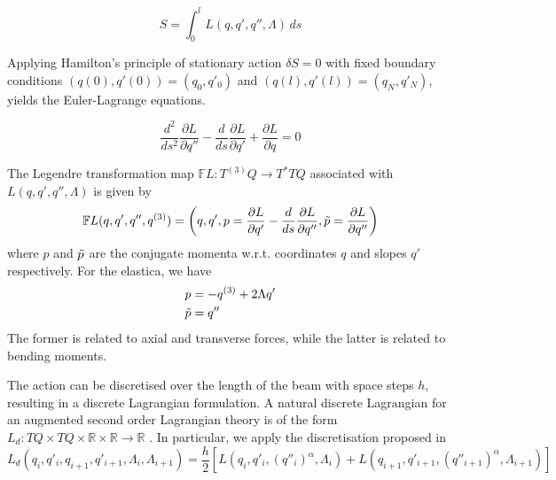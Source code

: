 \begin{equation}
    S = \int_{0}^{l} L \left(q,q',q'',\Lambda \right) \,ds 
\end{equation}

Applying Hamilton’s principle of stationary action $\delta S =0$ with fixed boundary conditions $(q(0),q'(0)) = (q_0,q'_0)$ and $(q(l),q'(l)) = (q_N, q'_N)$, yields the Euler-Lagrange equations.

\begin{equation}\label{eq:second_order_ELeq}
    \frac{d^2}{d s^2}  \frac{\partial L}{\partial q''} - \frac{d}{d s}  \frac{\partial L}{\partial q'} + \frac{\partial L}{\partial q} = 0
\end{equation}

The Legendre transformation map $\mathbb{F} L: T^{(3)} Q \rightarrow T^*TQ$ associated with $L(q,q',q'',\Lambda)$ is given by \cite{colombo2016}
\begin{align}
    \mathbb{F} L (q, q', q'', q^{(3)}) = \left( q, q', 
     p = \frac{\partial L}{\partial q'} - \frac{d}{ds} \frac{\partial L}{\partial q''}, 
    \Tilde{p} = \frac{\partial L}{\partial q''} \right)
\end{align}
where $p$ and $\Tilde{p}$ are the conjugate momenta w.r.t. coordinates $q$ and slopes $q'$ respectively. For the elastica, we have
\begin{equation}
    \begin{split}
        p &= - q^{(3)} + 2 \Lambda q' \\
        \Tilde{p} &= q'' 
    \end{split}
\end{equation}
The former is related to axial and transverse forces, while the latter is related to bending moments.
 
The action can be discretised over the length of the beam with space steps $h$, resulting in a discrete Lagrangian formulation. A natural discrete Lagrangian for an augmented second order Lagrangian theory is of the form $L_d: TQ \times TQ \times \mathbb{R} \times \mathbb{R} \rightarrow \mathbb{R}$ \cite{colombo2016}. In particular, we apply the discretisation proposed in \cite{ferraro2021}
\begin{equation}\label{eq:Ld_static_elastica}
    L_d \left( q_i, q'_i, q_{i+1}, q'_{i+1}, \Lambda_i, \Lambda_{i+1} \right) = \frac{h}{2} \left[ L (q_i,q'_i,(q''_i)^\alpha,\Lambda_i) + L (q_{i+1},q'_{i+1},(q''_{i+1})^\alpha, \Lambda_{i+1}) \right]
\end{equation}

